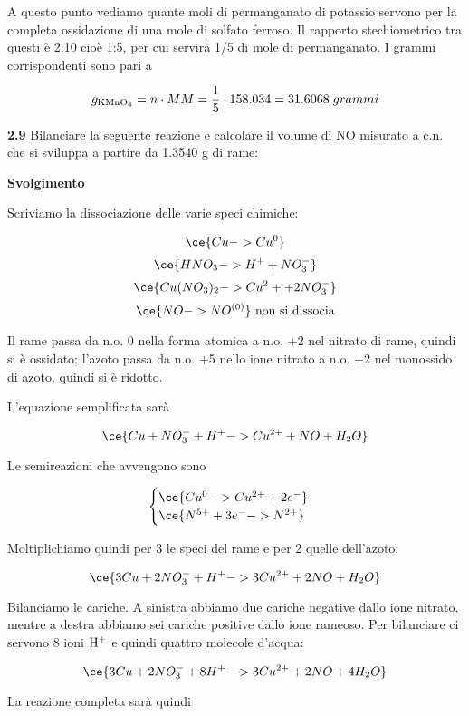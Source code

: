 A questo punto vediamo quante moli di permanganato di potassio servono per la completa ossidazione di una mole di solfato ferroso. Il rapporto stechiometrico tra questi è 2:10 cioè 1:5, per cui servirà 1/5 di mole di permanganato. I grammi corrispondenti sono pari a

$$g_{\rm KMnO_4}=n \cdot MM=\frac{1}{5} \cdot 158.034
=31.6068\;grammi$$

\vspace{0.2cm}\textbf{2.9} Bilanciare la seguente reazione e calcolare il volume di NO misurato a c.n. che si sviluppa a
partire da 1.3540 g di rame:

\begin{center}
\end{center}

\large\textbf{Svolgimento}\normalsize

\vspace{0.2cm}Scriviamo la dissociazione delle varie speci chimiche:

$$\ce{Cu -> Cu^0}$$
$$\ce{HNO_3 -> H^+ + NO_3^-}$$
$$\ce{Cu(NO_3)_2 -> Cu^2+ + 2NO_3^-}$$
$$\ce{NO -> NO^{(0)}} \text{ non si dissocia}$$

Il rame passa da n.o. 0 nella forma atomica a n.o. +2 nel nitrato di rame, quindi si è ossidato; l'azoto passa da n.o. +5 nello ione nitrato a n.o. +2 nel monossido di azoto, quindi si è ridotto.

L'equazione semplificata sarà

$$\ce{Cu + NO_3^- + H^+ -> Cu^{2+} + NO + H_2O}$$

Le semireazioni che avvengono sono

$$\begin{cases}
    \ce{Cu^0 -> Cu^{2+} + 2e^-}\\
    \ce{N^{5+} + 3e^- -> N^{2+}}
\end{cases}$$

Moltiplichiamo quindi per 3 le speci del rame e per 2 quelle dell'azoto:

$$\ce{3Cu + 2NO_3^- + H^+ -> 3Cu^{2+} + 2NO + H_2O}$$

Bilanciamo le cariche. A sinistra abbiamo due cariche negative dallo ione nitrato, mentre a destra abbiamo sei cariche positive dallo ione rameoso. Per bilanciare ci servono 8 ioni $\rm H^+$ e quindi quattro molecole d'acqua:

$$\ce{3Cu + 2NO_3^- + 8H^+ -> 3Cu^{2+} + 2NO + 4H_2O}$$

La reazione completa sarà quindi

